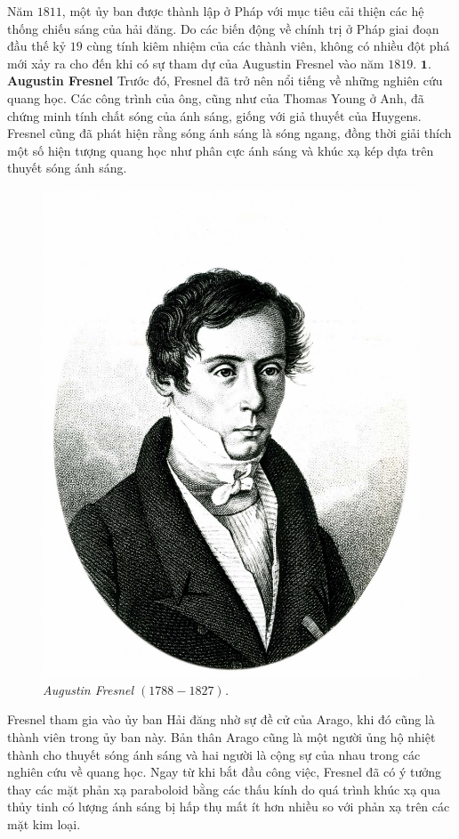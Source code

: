 \begin{multicols}{2}
	Năm $1811$, một ủy ban được thành lập ở Pháp với mục tiêu cải thiện các hệ thống chiếu sáng của hải đăng. Do các biến động về chính trị ở Pháp giai đoạn đầu thế kỷ $19$ cùng tính kiêm nhiệm của các thành viên, không có nhiều đột phá mới xảy ra cho đến khi có sự tham dự của Augustin Fresnel vào năm $1819$.
	\vskip 0.1cm
	$\pmb{1.}$ \textbf{\color{timhieukhoahoc}Augustin Fresnel}
	\vskip 0.1cm
	Trước đó, Fresnel đã trở nên nổi tiếng về những nghiên cứu quang học. Các công trình của ông, cũng như của Thomas Young ở Anh, đã chứng minh tính chất sóng của ánh sáng, giống với giả thuyết của Huygens. Fresnel cũng đã phát hiện rằng sóng ánh sáng là sóng ngang, đồng thời giải thích một số hiện tượng quang học như phân cực ánh sáng và khúc xạ kép dựa trên thuyết sóng ánh sáng.
	\begin{figure}[H]
		\vspace*{-5pt}
		\centering
		\captionsetup{labelformat= empty, justification=centering}
		\includegraphics[width= .7\linewidth]{3}
		\caption{\small\textit{\color{timhieukhoahoc}Augustin Fresnel $(1788-1827)$.}}
		\vspace*{-10pt}
	\end{figure}
	Fresnel tham gia vào ủy ban Hải đăng nhờ sự đề cử của Arago, khi đó cũng là thành viên trong ủy ban này. Bản thân Arago cũng là một người ủng hộ nhiệt thành cho thuyết sóng ánh sáng và hai người là cộng sự của nhau trong các nghiên cứu về quang học. Ngay từ khi bắt đầu công việc, Fresnel đã có ý tưởng thay các mặt phản xạ paraboloid bằng các thấu kính do quá trình khúc xạ qua thủy tinh có lượng ánh sáng bị hấp thụ mất ít hơn nhiều so với phản xạ trên các mặt kim loại.

\end{multicols}
